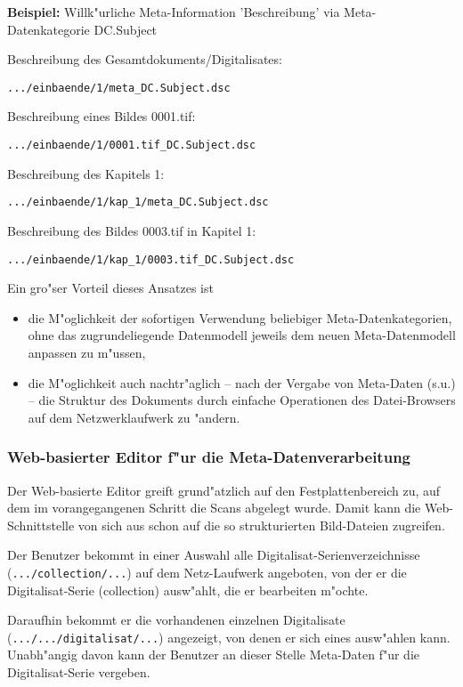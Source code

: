 \documentclass[11pt, twoside, a4paper, BCOR8mm, DIV12, bibtotoc,idxtotoc]{scrreprt}
\begin{document}
\textbf{Beispiel:} Willk"urliche Meta-Information 'Beschreibung' via
Meta-Datenkategorie DC.Subject

Beschreibung des Gesamtdokuments/Digitalisates:
\begin{verbatim}
.../einbaende/1/meta_DC.Subject.dsc 
\end{verbatim}

Beschreibung eines Bildes 0001.tif:
\begin{verbatim}
.../einbaende/1/0001.tif_DC.Subject.dsc
\end{verbatim}

Beschreibung des Kapitels 1:
\begin{verbatim}
.../einbaende/1/kap_1/meta_DC.Subject.dsc
\end{verbatim}

Beschreibung des Bildes 0003.tif in Kapitel 1:
\begin{verbatim}
.../einbaende/1/kap_1/0003.tif_DC.Subject.dsc
\end{verbatim}

Ein gro"ser Vorteil dieses Ansatzes ist

\begin{itemize}
\item die M"oglichkeit der sofortigen Verwendung beliebiger
  Meta-Datenkategorien, ohne das zugrundeliegende Datenmodell jeweils
  dem neuen Meta-Datenmodell anpassen zu m"ussen,
\item die M"oglichkeit auch nachtr"aglich -- nach der Vergabe von
  Meta-Daten (s.u.) -- die Struktur des Dokuments durch einfache Operationen
  des Datei-Browsers auf dem Netzwerklaufwerk zu "andern.
\end{itemize}

\subsubsection{Web-basierter Editor f"ur die Meta-Datenverarbeitung}

Der Web-basierte Editor greift grund"atzlich auf den
Festplattenbereich zu, auf dem im voran\-ge\-gan\-ge\-nen Schritt die
Scans abgelegt wurde. Damit kann die Web-Schnittstelle von sich aus
schon auf die so strukturierten Bild-Dateien zugreifen.

Der Benutzer bekommt in einer Auswahl alle 
Digitalisat-Serienverzeichnisse (\texttt{.../collection/...}) auf dem Netz-Laufwerk angeboten, von der
er die Digitalisat-Serie (collection) ausw"ahlt, die er
bearbeiten m"ochte.

Daraufhin bekommt er die vorhandenen einzelnen Digitalisate
(\texttt{.../.../digitalisat/...}) angezeigt, von denen er sich eines
ausw"ahlen kann. Unabh"angig davon kann der Benutzer an dieser Stelle
Meta-Daten f"ur die Digitalisat-Serie vergeben.
\end{document}

